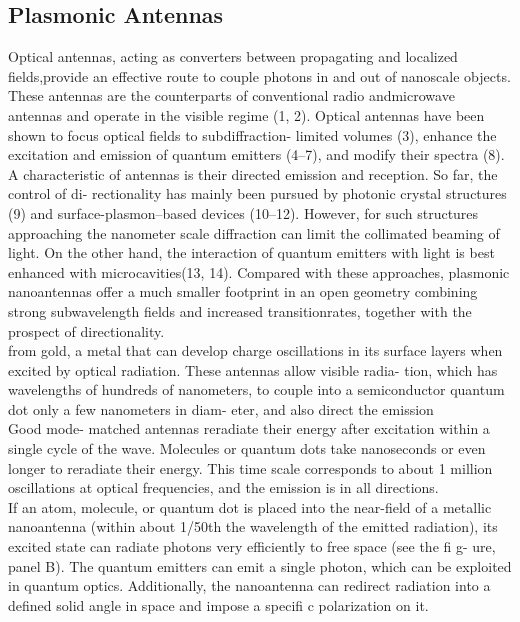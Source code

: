 	\subsection{Plasmonic Antennas}

	\cite{Curto2010}
	Optical antennas, acting as converters between propagating and localized fields,provide an effective route to couple photons in and out of nanoscale objects. These antennas are the counterparts of conventional radio andmicrowave antennas and operate in the visible regime (1, 2). Optical antennas have been shown to focus optical fields to subdiffraction- limited volumes (3), enhance the excitation and emission of quantum emitters (4–7), and modify their spectra (8). 
	\\
	A characteristic of antennas is their directed emission and reception. So far, the control of di- rectionality has mainly been pursued by photonic crystal structures (9) and surface-plasmon–based devices (10–12). However, for such structures approaching the nanometer scale diffraction can limit the collimated beaming of light. On the other hand, the interaction of quantum emitters with light is best enhanced with microcavities(13, 14). Compared with these approaches, plasmonic nanoantennas offer a much smaller footprint in an open geometry combining strong subwavelength fields and increased transitionrates, together with the prospect of directionality.
	\\
	\cite{Giessen2010}
	from gold, a metal that can develop charge oscillations in its surface layers when excited by optical radiation. These antennas allow visible radia- tion, which has wavelengths of hundreds of nanometers, to couple into a semiconductor quantum dot only a few nanometers in diam- eter, and also direct the emission
	\\
	Good mode- matched antennas reradiate their energy after excitation within a single cycle of the wave. Molecules or quantum dots take nanoseconds or even longer to reradiate their energy. This time scale corresponds to about 1 million oscillations at optical frequencies, and the emission is in all directions.
	\\
	If an atom, molecule, or quantum dot is placed into the near-field of a metallic nanoantenna (within about 1/50th the wavelength of the emitted radiation), its excited state can radiate photons very efficiently to free space (see the fi g- ure, panel B). The quantum emitters can emit a single photon, which can be exploited in quantum optics. Additionally, the nanoantenna can redirect radiation into a defined solid angle in space and impose a specifi c polarization on it.
